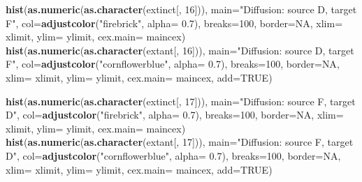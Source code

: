\documentclass[]{book}
\newenvironment{Shaded}{\begin{snugshade}}{\end{snugshade}}
\newcommand{\KeywordTok}[1]{\textcolor[rgb]{0.13,0.29,0.53}{\textbf{{#1}}}}
\newcommand{\DataTypeTok}[1]{\textcolor[rgb]{0.13,0.29,0.53}{{#1}}}
\newcommand{\DecValTok}[1]{\textcolor[rgb]{0.00,0.00,0.81}{{#1}}}
\newcommand{\FloatTok}[1]{\textcolor[rgb]{0.00,0.00,0.81}{{#1}}}
\newcommand{\StringTok}[1]{\textcolor[rgb]{0.31,0.60,0.02}{{#1}}}
\newcommand{\OtherTok}[1]{\textcolor[rgb]{0.56,0.35,0.01}{{#1}}}
\newcommand{\NormalTok}[1]{{#1}}
\theoremstyle{definition}
\theoremstyle{definition}
\theoremstyle{definition}
\theoremstyle{remark}
\begin{document}
\begin{Shaded}
\begin{Highlighting}[]
\KeywordTok{hist}\NormalTok{(}\KeywordTok{as.numeric}\NormalTok{(}\KeywordTok{as.character}\NormalTok{(extinct[, }\DecValTok{16}\NormalTok{])), }\DataTypeTok{main=}\StringTok{"Diffusion: source D, target F"}\NormalTok{, }\DataTypeTok{col=}\KeywordTok{adjustcolor}\NormalTok{(}\StringTok{"firebrick"}\NormalTok{, }\DataTypeTok{alpha=} \FloatTok{0.7}\NormalTok{), }\DataTypeTok{breaks=}\DecValTok{100}\NormalTok{, }\DataTypeTok{border=}\OtherTok{NA}\NormalTok{, }\DataTypeTok{xlim=}\NormalTok{ xlimit, }\DataTypeTok{ylim=}\NormalTok{ ylimit, }\DataTypeTok{cex.main=}\NormalTok{ maincex)}
\KeywordTok{hist}\NormalTok{(}\KeywordTok{as.numeric}\NormalTok{(}\KeywordTok{as.character}\NormalTok{(extant[, }\DecValTok{16}\NormalTok{])), }\DataTypeTok{main=}\StringTok{"Diffusion: source D, target F"}\NormalTok{, }\DataTypeTok{col=}\KeywordTok{adjustcolor}\NormalTok{(}\StringTok{"cornflowerblue"}\NormalTok{, }\DataTypeTok{alpha=} \FloatTok{0.7}\NormalTok{), }\DataTypeTok{breaks=}\DecValTok{100}\NormalTok{, }\DataTypeTok{border=}\OtherTok{NA}\NormalTok{, }\DataTypeTok{xlim=}\NormalTok{ xlimit, }\DataTypeTok{ylim=}\NormalTok{ ylimit, }\DataTypeTok{cex.main=}\NormalTok{ maincex, }\DataTypeTok{add=}\OtherTok{TRUE}\NormalTok{)}

\KeywordTok{hist}\NormalTok{(}\KeywordTok{as.numeric}\NormalTok{(}\KeywordTok{as.character}\NormalTok{(extinct[, }\DecValTok{17}\NormalTok{])), }\DataTypeTok{main=}\StringTok{"Diffusion: source F, target D"}\NormalTok{, }\DataTypeTok{col=}\KeywordTok{adjustcolor}\NormalTok{(}\StringTok{"firebrick"}\NormalTok{, }\DataTypeTok{alpha=} \FloatTok{0.7}\NormalTok{), }\DataTypeTok{breaks=}\DecValTok{100}\NormalTok{, }\DataTypeTok{border=}\OtherTok{NA}\NormalTok{, }\DataTypeTok{xlim=}\NormalTok{ xlimit, }\DataTypeTok{ylim=}\NormalTok{ ylimit, }\DataTypeTok{cex.main=}\NormalTok{ maincex)}
\KeywordTok{hist}\NormalTok{(}\KeywordTok{as.numeric}\NormalTok{(}\KeywordTok{as.character}\NormalTok{(extant[, }\DecValTok{17}\NormalTok{])), }\DataTypeTok{main=}\StringTok{"Diffusion: source F, target D"}\NormalTok{, }\DataTypeTok{col=}\KeywordTok{adjustcolor}\NormalTok{(}\StringTok{"cornflowerblue"}\NormalTok{, }\DataTypeTok{alpha=} \FloatTok{0.7}\NormalTok{), }\DataTypeTok{breaks=}\DecValTok{100}\NormalTok{, }\DataTypeTok{border=}\OtherTok{NA}\NormalTok{, }\DataTypeTok{xlim=}\NormalTok{ xlimit, }\DataTypeTok{ylim=}\NormalTok{ ylimit, }\DataTypeTok{cex.main=}\NormalTok{ maincex, }\DataTypeTok{add=}\OtherTok{TRUE}\NormalTok{)}


\end{Highlighting}
\end{Shaded}
\end{document}
